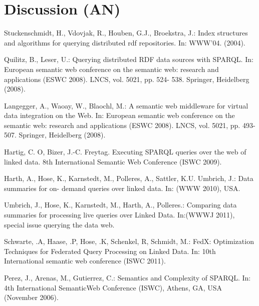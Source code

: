 \documentclass{sig-alternate}  %
\begin{document}
\section{Discussion (AN)}



%
%
\begin{thebibliography}{10}
Stuckenschmidt, H., Vdovjak, R., Houben, G.J., Broekstra,
J.: Index structures and algorithms for querying distributed rdf repositories.
In: WWW'04. (2004).

Quilitz, B., Leser, U.: Querying distributed RDF data
sources with SPARQL. In: European semantic web conference on the semantic
web: research and applications (ESWC 2008). LNCS, vol. 5021, pp. 524-
538. Springer, Heidelberg (2008).

Langegger, A., Waoay, W., Blaochl, M.: A semantic web
middleware for virtual data integration on the Web. In: European semantic
web conference on the semantic web: research and applications (ESWC
2008). LNCS, vol. 5021, pp. 493-507. Springer, Heidelberg (2008).

Hartig, C. O, Bizer, J.-C. Freytag. Executing SPARQL
queries over the web of linked data. 8th International Semantic Web
Conference (ISWC 2009).

Harth, A., Hose, K., Karnstedt, M., Polleres, A.,
Sattler, K.U. Umbrich, J.: Data summaries for on- demand queries over
linked data. In: (WWW 2010), USA.

Umbrich, J., Hose, K., Karnstedt, M., Harth, A., Polleres.:
Comparing data summaries for processing live queries over Linked Data.
In:(WWWJ 2011), special issue querying the data web. 

Schwarte, .A, Haase, .P, Hose, .K, Schenkel, R, Schmidt,
M.: FedX: Optimization Techniques for Federated Query Processing on
Linked Data. In: 10th International semantic web conference (ISWC
2011).

Perez, J., Arenas, M., Gutierrez, C.: Semantics and
Complexity of SPARQL. In: 4th International SemanticWeb Conference
(ISWC), Athens, GA, USA (November 2006).


\end{thebibliography}
\end{document}
